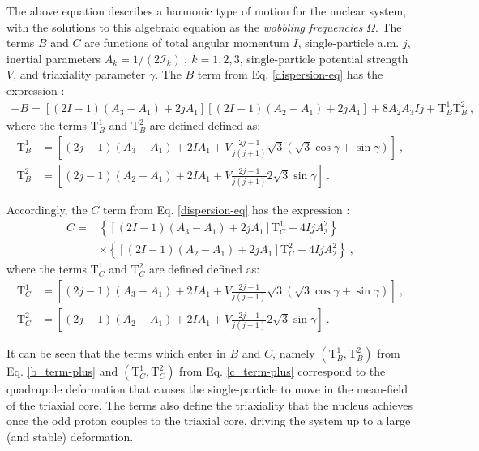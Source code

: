 \documentclass[myclassdoc,debug]{rjparticle}
\begin{document}
The above equation describes a harmonic type of motion for the nuclear system, with the solutions to this algebraic equation as the \emph{wobbling frequencies} $\Omega$. The terms $B$ and $C$ are  functions of total angular momentum $I$, single-particle a.m. $j$, inertial parameters $A_k=1/(2\mathcal{I}_k)\ ,\ k=1,2,3$, single-particle potential strength $V$, and triaxiality parameter $\gamma$.  The $B$ term from Eq. \ref{dispersion-eq} has the expression \cite{raduta2020approach}:
\begin{align}
 -B=\left[(2I-1)(A_3-A_1)+2jA_1\right]\left[(2I-1)(A_2-A_1)+2jA_1\right]+8A_2A_3Ij+\text{T}_B^1\text{T}_B^2\ ,
 \label{b_term}
 \end{align}
 where the terms $\text{T}_B^1$ and $\text{T}_B^2$ are defined defined as:
 \begin{align}
 \text{T}_B^1&=\left[(2j-1)(A_3-A_1)+2IA_1+V\frac{2j-1}{j(j+1)}\sqrt{3}(\sqrt{3}\cos\gamma+\sin\gamma)\right]\ , \nonumber \\
 \text{T}_B^2&=\left[(2j-1)(A_2-A_1)+2IA_1+V\frac{2j-1}{j(j+1)}2\sqrt{3}\sin\gamma\right]\ .
 \label{b_term-plus}
\end{align}

Accordingly, the $C$ term from Eq. \ref{dispersion-eq} has the expression \cite{raduta2020approach}:
\begin{align}
    C=&\left\{\left[(2I-1)(A_3-A_1)+2jA_1\right]\text{T}_C^1
- 4IjA_3^2\right \} \nonumber\\
      &\times\left\{\left[(2I-1)(A_2-A_1)+2jA_1\right]\text{T}_C^2-4IjA_2^2\right\}\ ,
      \label{c_term}
\end{align}
where the terms $\text{T}_C^1$ and $\text{T}_C^2$ are defined defined as:
\begin{align}
    \text{T}_C^1&=\left[(2j-1)(A_3-A_1)+2IA_1+V\frac{2j-1}{j(j+1)}\sqrt{3}(\sqrt{3}\cos\gamma+\sin\gamma)\right]\ , \nonumber\\
    \text{T}_C^2&=\left[(2j-1)(A_2-A_1)+2IA_1+V\frac{2j-1}{j(j+1)}2\sqrt{3}\sin\gamma\right]\ . 
    \label{c_term-plus}
\end{align}

It can be seen that the terms which enter in $B$ and $C$, namely $(\text{T}_B^1,\text{T}_B^2)$ from Eq. \ref{b_term-plus} and $(\text{T}_C^1,\text{T}_C^2)$ from Eq. \ref{c_term-plus} correspond to the quadrupole deformation that causes the single-particle to move in the mean-field of the triaxial core. The terms also define the triaxiality that the nucleus achieves once the odd proton couples to the triaxial core, driving the system up to a large (and stable) deformation.
\end{document}

